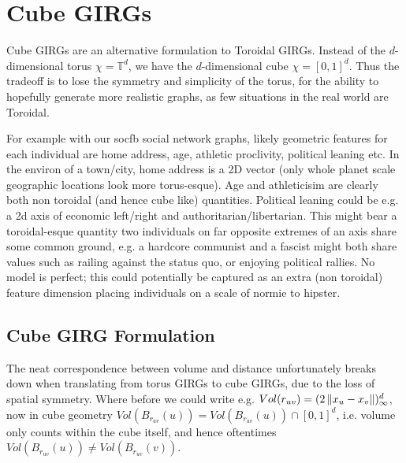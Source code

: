 \section{Cube GIRGs}

Cube GIRGs are an alternative formulation to Toroidal GIRGs. Instead of the $d$-dimensional torus $\chi = \mathbb{T}^d$, we have the $d$-dimensional cube $\chi = [0,1]^d$. Thus the tradeoff is to lose the symmetry and simplicity of the torus, for the ability to hopefully generate more realistic graphs, as few situations in the real world are Toroidal.


For example with our socfb social network graphs, likely geometric features for each individual are home address, age, athletic proclivity, political leaning etc.
In the environ of a town/city, home address is a 2D vector (only whole planet scale geographic locations look more torus-esque).
Age and athleticisim are clearly both non toroidal (and hence cube like) quantities.
Political leaning could be e.g. a 2d axis of economic left/right and authoritarian/libertarian. This might bear a toroidal-esque quantity two individuals on far opposite extremes of an axis share some common ground, e.g. a hardcore communist and a fascist might both share values such as railing against the status quo, or enjoying political rallies. No model is perfect; this could potentially be captured as an extra (non toroidal) feature dimension placing individuals on a scale of normie to hipster.

\subsection{Cube GIRG Formulation}
The neat correspondence between volume and distance unfortunately breaks down when translating from torus GIRGs to cube GIRGs, due to the loss of spatial symmetry. Where before we could write e.g. $Vol(r_{uv}) = (2 \left\lVert x_u - x_v\right\rVert)_\infty^d$, now in cube geometry $Vol(B_{r_{uv}}(u)) = Vol(B_{r_{uv}}(u)) \cap [0, 1]^d$, i.e. volume only counts within the cube itself, and hence oftentimes $Vol(B_{r_{uv}}(u)) \neq Vol(B_{r_{uv}}(v))$. 

